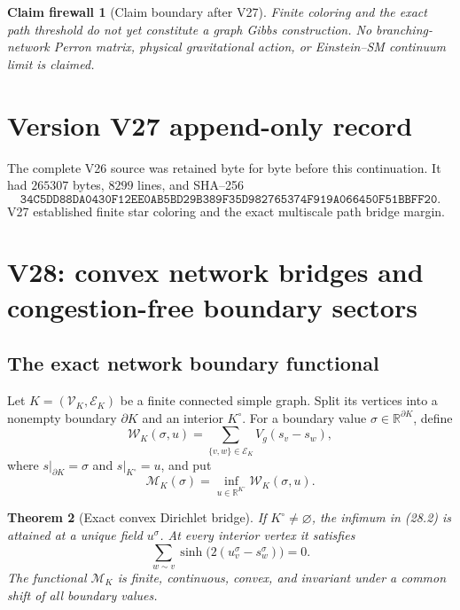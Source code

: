 \documentclass[11pt]{article}
\newtheorem{theorem}{Theorem}[section]
\newtheorem{firewall}[theorem]{Claim firewall}
\theoremstyle{remark}
\begin{document}
\begin{firewall}[Claim boundary after V27]
\label{fire:v17v27}
Finite coloring and the exact path threshold do not yet constitute a
graph Gibbs construction.  No branching-network Perron matrix,
physical gravitational action, or Einstein--SM continuum limit is
claimed.
\end{firewall}

\section*{Version V27 append-only record}
The complete V26 source was retained byte for byte before this
continuation.  It had \(265307\) bytes, \(8299\) lines, and SHA--256
\[
 \texttt{34C5DD88DA0430F12EE0AB5BD29B389F35D982765374F919A066450F51BBFF20}.
\]
V27 established finite star coloring and the exact multiscale path
bridge margin.


\section{V28: convex network bridges and congestion-free boundary sectors}
\label{sec:v17v28}

\subsection{The exact network boundary functional}

Let \(K=(\mathcal V_K,\mathcal E_K)\) be a finite connected simple
graph.  Split its vertices into a nonempty boundary \(\partial K\) and
an interior \(K^\circ\).  For a boundary value
\(\sigma\in\mathbb R^{\partial K}\), define
\[
 \mathcal W_K(\sigma,u)
 =\sum_{\{v,w\}\in\mathcal E_K}V_g(s_v-s_w),       \tag{28.1}
\]
where \(s|_{\partial K}=\sigma\) and
\(s|_{K^\circ}=u\), and put
\[
 \mathcal M_K(\sigma)
 =\inf_{u\in\mathbb R^{K^\circ}}
 \mathcal W_K(\sigma,u).                          \tag{28.2}
\]

\begin{theorem}[Exact convex Dirichlet bridge]
\label{thm:v17v28-dirichlet}
If \(K^\circ\ne\varnothing\), the infimum in (28.2) is attained at a
unique field \(u^\sigma\).  At every interior vertex it satisfies
\[
 \sum_{w\sim v}\sinh\bigl(2(u_v^\sigma-s_w^\sigma)\bigr)=0.
                                                               \tag{28.3}
\]
The functional \(\mathcal M_K\) is finite, continuous, convex, and
invariant under a common shift of all boundary values.
\end{theorem}
\end{document}
